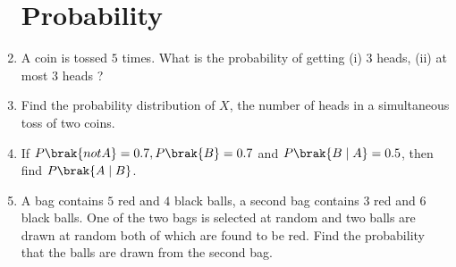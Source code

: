 \begin{enumerate}
\section*{Probability}
\item A coin is tossed $5$ times. What is the probability of getting (i) $3$ heads,
 (ii) at most $3$ heads ?
\item Find the probability distribution of $X$, the number of heads in a simultaneous toss of two coins.
\item If $P\brak{not A} =0.7, P\brak{B}=0.7$ and $P\brak{B\mid A}=0.5$, then find $P\brak{A\mid B}$.
\item A bag contains $5$ red and $4$ black balls, a second bag contains $3$ red and $6$ black balls. One of the two bags is selected at random and two balls are drawn at random  both of which are found to be red. Find the probability that the balls are drawn from the second bag.      
\end{enumerate}